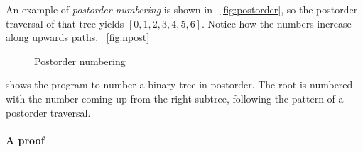 An example of \emph{postorder numbering} is shown in \fig~\vref{fig:postorder}, so the postorder
traversal of that tree yields \([0,1,2,3,4,5,6]\). Notice how the
numbers increase along upwards paths. \Fig~\vref{fig:npost}
\begin{figure}
\centering
{}
\caption{Postorder numbering}
\label{fig:npost}
\end{figure}
shows the program to number a binary tree in postorder. The root is
numbered with the number coming up from the right subtree, following
the pattern of a postorder traversal.

\paragraph{A proof}\label{proof:PreMir}

